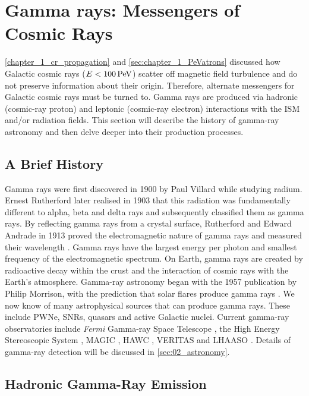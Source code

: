 \section{Gamma rays: Messengers of Cosmic Rays} \label
{sec:chapter1_non_thermal_emission}
\autoref{chapter_1_cr_propagation} and \autoref{sec:chapter_1_PeVatrons} discussed how Galactic cosmic rays ($E<100\,\PeV$) scatter off magnetic field turbulence and do not preserve information about their origin. Therefore, alternate messengers for Galactic cosmic rays must be turned to. Gamma rays are produced via hadronic (cosmic-ray proton) and leptonic (cosmic-ray electron) interactions with the ISM and/or radiation fields. This section will describe the history of gamma-ray astronomy and then delve deeper into their production processes.

\subsection{A Brief History}

Gamma rays were first discovered in 1900 by Paul Villard while studying radium. Ernest Rutherford later realised in 1903 that this radiation was fundamentally different to alpha, beta and delta rays and subsequently classified them as gamma rays. By reflecting gamma rays from a crystal surface, Rutherford and Edward Andrade in 1913 proved the electromagnetic nature of gamma rays and measured their wavelength \citep{1913Natur..92..267R}. Gamma rays have the largest energy per photon and smallest frequency of the electromagnetic spectrum. On Earth, gamma rays are created by radioactive decay within the crust and the interaction of cosmic rays with the Earth's atmosphere. Gamma-ray astronomy began with the 1957 publication by Philip Morrison, with the prediction that solar flares produce gamma rays \citep{1958NCim....7..858M}. We now know of many astrophysical sources that can produce gamma rays. These include PWNe, SNRs, quasars and active Galactic nuclei. Current gamma-ray observatories include \textit{Fermi} Gamma-ray Space Telescope \citep{nasa_fermi_site}, the High Energy Stereoscopic System \citep{HESS}, MAGIC \citep{MAGIC}, HAWC \citep{HAWC}, VERITAS \citep{VERITAS} and LHAASO \citep{LHAASO_website}. Details of gamma-ray detection will be discussed in \autoref{sec:02_astronomy}.

\subsection{Hadronic Gamma-Ray Emission} \label{sec:chapter1_hadronic_gr_emission}

